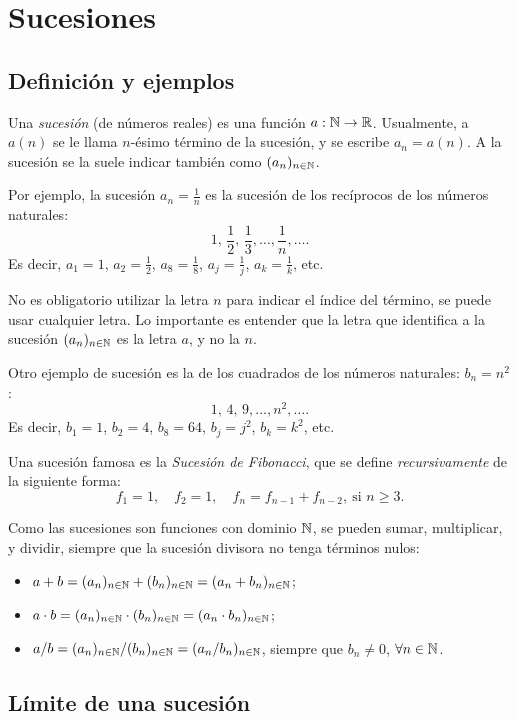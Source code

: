 \chapter{Sucesiones}\label{C:sucesiones}

\section{Definición y ejemplos}

\begin{definition}
    Una \emph{sucesión} (de números reales) es una función $a:\mathbb{N} \to \mathbb{R}$.
    Usualmente, a $a(n)$ se le llama $n$-ésimo término de la sucesión, y se escribe $a_n = a(n)$. 
    A la sucesión se la suele indicar también como $(a_n)_{n\in\mathbb{N}}$.
\end{definition}

Por ejemplo, la sucesión $a_n = \frac1n$ es la sucesión de los recíprocos de los números naturales:
\[
1,\,\frac12,\,\frac13,\dots,\frac1n,\dots.
\]
Es decir, $a_1=1$, $a_2=\frac12$, $a_8=\frac18$, $a_j = \frac1j$, $a_k = \frac1k$, etc.

No es obligatorio utilizar la letra $n$ para indicar el índice del término, se puede usar cualquier letra. Lo importante es entender que la letra que identifica a la sucesión $(a_n)_{n\in\mathbb{N}}$ es la letra $a$, y no la $n$.

Otro ejemplo de sucesión es la de los cuadrados de los números naturales: $b_n = n^2$:
\[
1,\,4,\,9,\dots,n^2,\dots.
\]
Es decir, $b_1=1$, $b_2=4$, $b_8=64$, $b_j = j^2$, $b_k = k^2$, etc.

Una sucesión famosa es la \emph{Sucesión de Fibonacci}, que se define \emph{recursivamente} de la siguiente forma:
\[
f_1 = 1, \quad f_2 = 1, \quad f_n = f_{n-1} + f_{n-2},\ \text{si $n \ge 3$}.
\]

Como las sucesiones son funciones con dominio $\mathbb{N}$, se pueden sumar, multiplicar, y dividir, siempre que la sucesión divisora no tenga términos nulos:
\begin{itemize}
    \item $a+b = (a_n)_{n\in\mathbb{N}} + (b_n)_{n\in\mathbb{N}} = (a_n+b_n)_{n\in\mathbb{N}}$;
    \item $a\cdot b = (a_n)_{n\in\mathbb{N}} \cdot (b_n)_{n\in\mathbb{N}} = (a_n\cdot b_n)_{n\in\mathbb{N}}$;
    \item $a/b = (a_n)_{n\in\mathbb{N}} / (b_n)_{n\in\mathbb{N}} = (a_n/b_n)_{n\in\mathbb{N}}$, siempre que $b_n\neq 0$, $\forall n\in\mathbb{N}$.
\end{itemize}

\section{Límite de una sucesión}\label{S:limite sucesiones}

